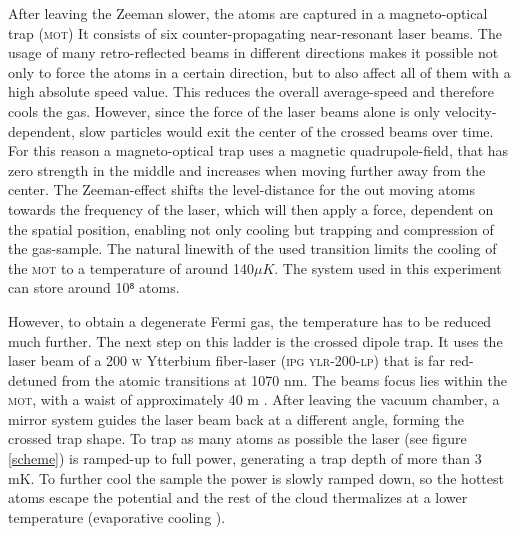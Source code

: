 After leaving the Zeeman slower, the atoms are captured in a magneto-optical trap (\textsc{mot})
It consists of six counter-propagating near-resonant laser beams. The usage of many retro-reflected beams in different directions makes it possible not only to force the atoms in a certain direction, but to also affect all of them with a high absolute speed value. This reduces the overall average-speed and therefore cools the gas. However, since the force of the laser beams alone is only velocity-dependent, slow particles would exit the center of the crossed beams over time. For this reason a magneto-optical trap uses a magnetic quadrupole-field, that has zero strength in the middle and increases when moving further away from the center. The Zeeman-effect shifts the level-distance for the out moving atoms towards the frequency of the laser, which will then apply a force, dependent on the spatial position, enabling not only cooling but trapping and compression of the gas-sample. The natural linewith of the used transition limits the cooling of the \textsc{mot} to a temperature of around 140$\unit{\mu K}$. The system used in this experiment can store around 10⁸ atoms. 

However, to obtain a degenerate Fermi gas, the temperature has to be reduced much further. The next step on this ladder is the crossed dipole trap. 
It uses the laser beam of a 200 \textsc{w} Ytterbium fiber-laser (\textsc{ipg ylr-200-lp}) that is far red-detuned from the atomic transitions at 1070 nm. The beams focus lies within the \textsc{mot}, with a waist of approximately 40 \mu m \cite{lompe}. After leaving the vacuum chamber, a mirror system guides the laser beam back at a different angle, forming the crossed trap shape. To trap as many atoms as possible the laser (see figure \ref{scheme}) is ramped-up to full power, generating a trap depth of more than 3 mK. To further cool the sample the power is slowly ramped down, so the hottest atoms escape the potential and the rest of the cloud thermalizes at a lower temperature (evaporative cooling \cite{metcalf}).

